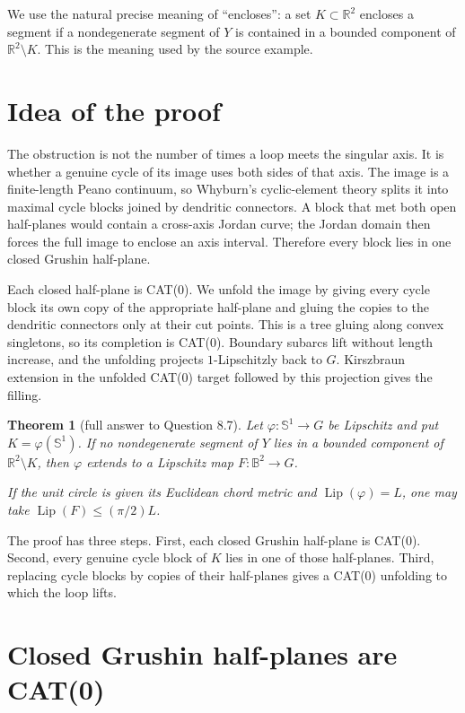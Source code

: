 \documentclass[11pt]{article}
\newtheorem{theorem}{Theorem}
\newcommand{\R}{\mathbb R}
\newcommand{\Sph}{\mathbb S}
\newcommand{\B}{\mathbb B}
\newcommand{\Lip}{\operatorname{Lip}}
\begin{document}
We use the natural precise meaning of ``encloses'': a set $K\subset\R^2$
encloses a segment if a nondegenerate segment of $Y$ is contained in a
bounded component of $\R^2\setminus K$.  This is the meaning used by the
source example.

\section{Idea of the proof}

The obstruction is not the number of times a loop meets the singular axis.
It is whether a genuine cycle of its image uses both sides of that axis.  The
image is a finite-length Peano continuum, so Whyburn's cyclic-element theory
splits it into maximal cycle blocks joined by dendritic connectors.  A block
that met both open half-planes would contain a cross-axis Jordan curve; the
Jordan domain then forces the full image to enclose an axis interval.
Therefore every block lies in one closed Grushin half-plane.

Each closed half-plane is CAT(0).  We unfold the image by giving every cycle
block its own copy of the appropriate half-plane and gluing the copies to the
dendritic connectors only at their cut points.  This is a tree gluing along
convex singletons, so its completion is CAT(0).  Boundary subarcs lift without
length increase, and the unfolding projects $1$-Lipschitzly back to $G$.
Kirszbraun extension in the unfolded CAT(0) target followed by this projection
gives the filling.

\begin{theorem}[full answer to Question 8.7]\label{thm:main}
Let $\varphi:\Sph^1\to G$ be Lipschitz and put
$K=\varphi(\Sph^1)$.  If no nondegenerate segment of $Y$ lies in a bounded
component of $\R^2\setminus K$, then $\varphi$ extends to a Lipschitz map
$F:\B^2\to G$.

If the unit circle is given its Euclidean chord metric and
$\Lip(\varphi)=L$, one may take $\Lip(F)\le (\pi/2)L$.
\end{theorem}

The proof has three steps.  First, each closed Grushin half-plane is CAT(0).
Second, every genuine cycle block of $K$ lies in one of those half-planes.
Third, replacing cycle blocks by copies of their half-planes gives a CAT(0)
unfolding to which the loop lifts.

\section{Closed Grushin half-planes are CAT(0)}
\end{document}
